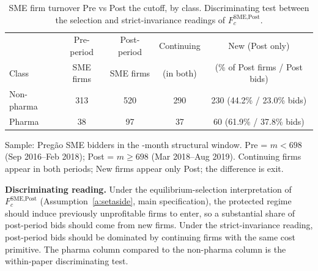 \begin{table}[!htbp]
\centering
\begin{threeparttable}
\caption{SME firm turnover Pre vs Post the \policyCutoffMonth{} cutoff, by class. Discriminating test between the selection and strict-invariance readings of $F_c^{\text{SME,Post}}$.}
\label{tab:pharma_firm_turnover}
\footnotesize
\setlength{\tabcolsep}{6pt}
\begin{tabular}{lcccc}
\toprule
 & Pre-period & Post-period & Continuing & New (Post only) \\
Class & SME firms & SME firms & (in both)  & (\% of Post firms / Post bids) \\
\midrule
Non-pharma & 313 & 520 & 290 & 230 (44.2\% / 23.0\% bids)\\
Pharma & 38 & 97 & 37 & 60 (61.9\% / 37.8\% bids)\\
\bottomrule
\end{tabular}
\begin{tablenotes}\footnotesize
\item Sample: Preg\~ao SME bidders in the \structuralWindowM-month structural window. Pre = $m < 698$ (Sep 2016--Feb 2018); Post = $m \ge 698$ (Mar 2018--Aug 2019). Continuing firms appear in both periods; New firms appear only Post; the difference is exit.
\item \textbf{Discriminating reading.} Under the equilibrium-selection interpretation of $F_c^{\text{SME,Post}}$ (Assumption~\ref{a:setaside}, main specification), the protected regime should induce previously unprofitable firms to enter, so a substantial share of post-period bids should come from new firms. Under the strict-invariance reading, post-period bids should be dominated by continuing firms with the same cost primitive. The pharma column compared to the non-pharma column is the within-paper discriminating test.
\end{tablenotes}
\end{threeparttable}
\end{table}
